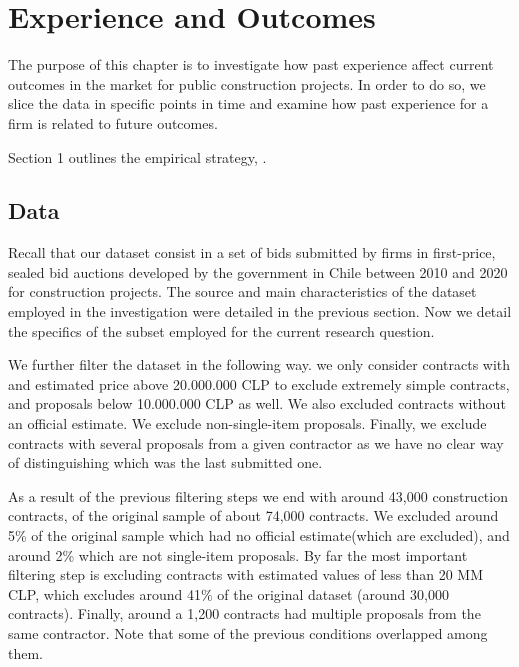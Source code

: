 \chapter{Experience and Outcomes
}
The purpose of this chapter is to investigate how past experience affect current outcomes in the market for public construction projects. In order to do so, we slice the data in specific points in time and examine how past experience for a firm is related to future outcomes.

 Section 1 outlines the empirical strategy, .

\section{Data}
Recall that our dataset consist in a set of bids submitted by firms in first-price, sealed bid auctions developed by the government in Chile between 2010 and 2020 for construction projects. The source and main characteristics of the dataset employed in the investigation were detailed in the previous section. Now we detail the specifics of the subset employed for the current research question.

 We further filter the dataset in the following way. we only consider contracts with and estimated price above 20.000.000 CLP to exclude extremely simple contracts, and proposals below 10.000.000 CLP as well. We also excluded contracts without an official estimate. We exclude non-single-item proposals. Finally, we exclude contracts with several proposals from a given contractor as we have no clear way of distinguishing which was the last submitted one.

As a result of the previous filtering steps we end with around 43,000 construction contracts, of the original sample of about 74,000 contracts. We excluded around 5\% of the original sample which had no  official estimate(which are excluded), and around 2\% which are not single-item proposals. By far the most important filtering step is excluding contracts with estimated values of less than 20 MM CLP, which excludes around 41\% of the original dataset (around 30,000 contracts). Finally, around a 1,200 contracts had multiple proposals from the same contractor. Note that some of the previous conditions overlapped among them.

